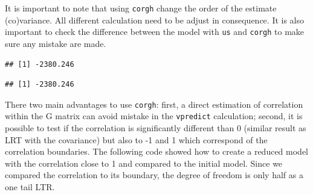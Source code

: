 \documentclass[
  12pt,
]{book}
\newenvironment{Shaded}{\begin{snugshade}}{\end{snugshade}}
\newcommand{\FunctionTok}[1]{\textcolor[rgb]{0.00,0.00,0.00}{#1}}
\newcommand{\NormalTok}[1]{#1}
\newcommand{\SpecialCharTok}[1]{\textcolor[rgb]{0.00,0.00,0.00}{#1}}
\begin{document}
It is important to note that using \texttt{corgh} change the order of the estimate (co)variance. All different calculation need to be adjust in consequence.
It is also important to check the difference between the model with \texttt{us} and \texttt{corgh} to make sure any mistake are made.

\begin{Shaded}
\end{Shaded}

\begin{verbatim}
## [1] -2380.246
\end{verbatim}

\begin{Shaded}
\end{Shaded}

\begin{verbatim}
## [1] -2380.246
\end{verbatim}

There two main advantages to use \texttt{corgh}: first, a direct estimation of correlation within the G matrix can avoid mistake in the \texttt{vpredict} calculation; second, it is possible to test if the correlation is significantly different than 0 (similar result as LRT with the covariance) but also to -1 and 1 which correspond of the correlation boundaries.
The following code showed how to create a reduced model with the correlation close to 1 and compared to the initial model.
Since we compared the correlation to its boundary, the degree of freedom is only half as a one tail LTR.
\end{document}
